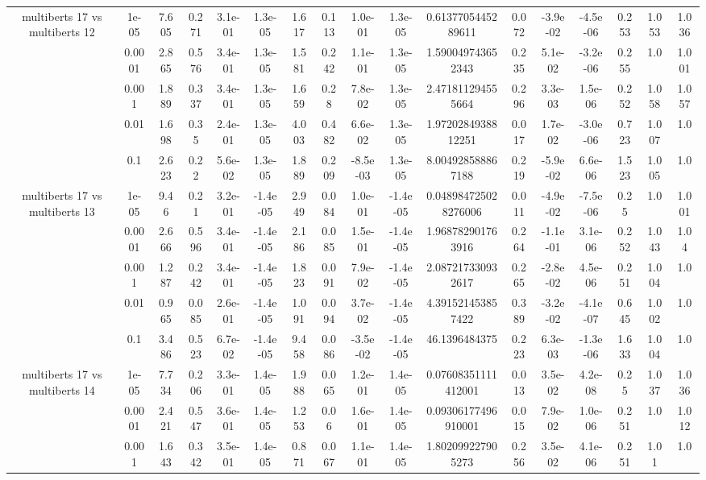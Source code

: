 \begin{tabular}{|c|c|c|c|c|c|c|c|c|c|c|c|c|c|c|c|c|}
\hline
\multirow{5}{*}{multiberts 17 vs multiberts 12} & 1e-05 & 7.605 & 0.271 & 3.1e-01 & 1.3e-05 & 1.617 & 0.113 & 1.0e-01 & 1.3e-05 & 0.6137705445289611 & 0.072 & -3.9e-02 & -4.5e-06 & 0.253 & 1.053 & 1.036 \\
 & 0.0001 & 2.865 & 0.576 & 3.4e-01 & 1.3e-05 & 1.581 & 0.242 & 1.1e-01 & 1.3e-05 & 1.590049743652343 & 0.235 & 5.1e-02 & -3.2e-06 & 0.255 & 1.0 & 1.001 \\
 & 0.001 & 1.889 & 0.337 & 3.4e-01 & 1.3e-05 & 1.659 & 0.28 & 7.8e-02 & 1.3e-05 & 2.471811294555664 & 0.296 & 3.3e-03 & 1.5e-06 & 0.252 & 1.058 & 1.057 \\
 & 0.01 & 1.698 & 0.35 & 2.4e-01 & 1.3e-05 & 4.003 & 0.482 & 6.6e-02 & 1.3e-05 & 1.9720284938812251 & 0.017 & 1.7e-02 & -3.0e-06 & 0.723 & 1.007 & 1.0 \\
 & 0.1 & 2.623 & 0.22 & 5.6e-02 & 1.3e-05 & 1.889 & 0.209 & -8.5e-03 & 1.3e-05 & 8.004928588867188 & 0.219 & -5.9e-02 & 6.6e-06 & 1.523 & 1.005 & 1.0 \\
\hline
\multirow{5}{*}{multiberts 17 vs multiberts 13} & 1e-05 & 9.46 & 0.21 & 3.2e-01 & -1.4e-05 & 2.949 & 0.084 & 1.0e-01 & -1.4e-05 & 0.048984725028276006 & 0.011 & -4.9e-02 & -7.5e-06 & 0.25 & 1.0 & 1.001 \\
 & 0.0001 & 2.666 & 0.596 & 3.4e-01 & -1.4e-05 & 2.186 & 0.085 & 1.5e-01 & -1.4e-05 & 1.968782901763916 & 0.264 & -1.1e-01 & 3.1e-06 & 0.252 & 1.043 & 1.04 \\
 & 0.001 & 1.287 & 0.242 & 3.4e-01 & -1.4e-05 & 1.823 & 0.091 & 7.9e-02 & -1.4e-05 & 2.087217330932617 & 0.265 & -2.8e-02 & 4.5e-06 & 0.251 & 1.004 & 1.0 \\
 & 0.01 & 0.965 & 0.085 & 2.6e-01 & -1.4e-05 & 1.091 & 0.094 & 3.7e-02 & -1.4e-05 & 4.391521453857422 & 0.389 & -3.2e-02 & -4.1e-07 & 0.645 & 1.002 & 1.0 \\
 & 0.1 & 3.486 & 0.523 & 6.7e-02 & -1.4e-05 & 9.458 & 0.086 & -3.5e-02 & -1.4e-05 & 46.1396484375 & 0.223 & 6.3e-03 & -1.3e-06 & 1.633 & 1.004 & 1.0 \\
\hline
\multirow{5}{*}{multiberts 17 vs multiberts 14} & 1e-05 & 7.734 & 0.206 & 3.3e-01 & 1.4e-05 & 1.988 & 0.065 & 1.2e-01 & 1.4e-05 & 0.07608351111412001 & 0.013 & 3.5e-02 & 4.2e-08 & 0.25 & 1.037 & 1.036 \\
 & 0.0001 & 2.421 & 0.547 & 3.6e-01 & 1.4e-05 & 1.253 & 0.06 & 1.6e-01 & 1.4e-05 & 0.09306177496910001 & 0.015 & 7.9e-02 & 1.0e-06 & 0.251 & 1.0 & 1.012 \\
 & 0.001 & 1.643 & 0.342 & 3.5e-01 & 1.4e-05 & 0.871 & 0.067 & 1.1e-01 & 1.4e-05 & 1.802099227905273 & 0.256 & 3.5e-02 & 4.1e-06 & 0.251 & 1.01 & 1.0 \\

\end{tabular}
